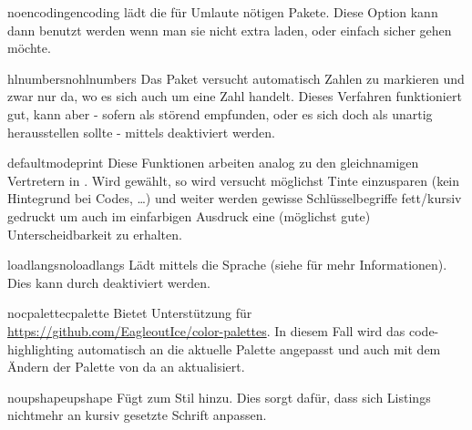 \documentclass{sopra-base}
\begin{document}
    \begin{argument}{noencoding}{encoding}
        \label{mrk:encoding} lädt die für Umlaute nötigen Pakete. Diese Option kann dann benutzt werden wenn man sie nicht extra laden, oder einfach sicher gehen möchte.
    \end{argument}

    \begin{argument}{hlnumbers}{nohlnumbers}
        Das Paket versucht automatisch Zahlen zu markieren und zwar nur da, wo es sich auch um eine Zahl handelt. Dieses Verfahren funktioniert gut, kann aber - sofern als störend empfunden, oder es sich doch als unartig herausstellen sollte - mittels  deaktiviert werden.
    \end{argument}

    \begin{argument}{defaultmode}{print}
        Diese Funktionen arbeiten analog zu den gleichnamigen Vertretern in . Wird  gewählt, so wird versucht möglichst Tinte einzusparen (kein Hintegrund bei Codes, \ldots) und weiter werden gewisse
        Schlüsselbegriffe fett/kursiv gedruckt um auch im einfarbigen Ausdruck eine
        (möglichst gute) Unterscheidbarkeit zu erhalten.
    \end{argument}

    \begin{argument}{loadlangs}{noloadlangs}
        Lädt mittels  die Sprache  (siehe  für mehr Informationen). Dies kann durch  deaktiviert werden. 
    \end{argument}

    \begin{argument}{nocpalette}{cpalette}
        Bietet Unterstützung für \href{color-palettes}{https://github.com/EagleoutIce/color-palettes}. In diesem Fall wird das code-highlighting automatisch an die aktuelle Palette angepasst und auch mit dem Ändern der Palette von da an aktualisiert.
    \end{argument}

    \begin{argument}{noupshape}{upshape}
        Fügt  zum Stil hinzu. Dies sorgt dafür, dass sich Listings nichtmehr an kursiv gesetzte Schrift anpassen.
    \end{argument}
\end{document}
